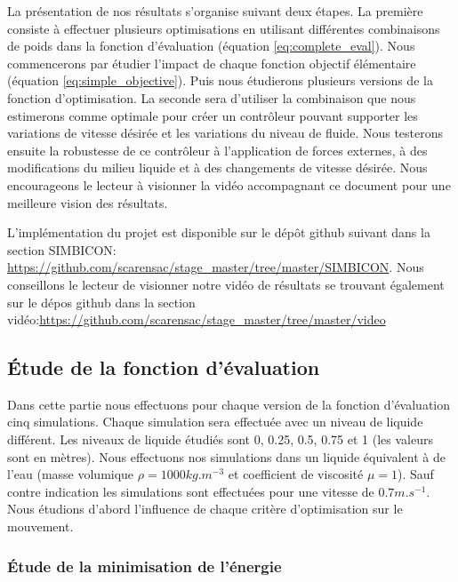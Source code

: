 \documentclass[runningheads,a4paper]{llncs}
\begin{document}
La présentation de nos résultats s'organise suivant deux étapes. La première consiste à effectuer plusieurs optimisations en utilisant différentes combinaisons de poids dans la fonction d'évaluation (équation \ref{eq:complete_eval}). Nous commencerons par étudier l'impact de chaque fonction objectif élémentaire (équation \ref{eq:simple_objective}). Puis nous étudierons plusieurs versions de la fonction d'optimisation. La seconde sera d'utiliser la combinaison que nous estimerons comme optimale pour créer un contrôleur pouvant supporter les variations de vitesse désirée et les variations du niveau de fluide. Nous testerons ensuite la robustesse de ce contrôleur à l'application de forces externes, à des modifications du milieu liquide et à des changements de vitesse désirée. Nous encourageons le lecteur à visionner la vidéo accompagnant ce document pour une meilleure vision des résultats.

L'implémentation du projet est disponible sur le dépôt github suivant dans la section SIMBICON: \url{https://github.com/scarensac/stage_master/tree/master/SIMBICON}. Nous conseillons le lecteur de visionner notre vidéo de résultats se trouvant également sur le dépos github dans la section vidéo:\url{https://github.com/scarensac/stage_master/tree/master/video}

\subsection{Étude de la fonction d'évaluation}

Dans cette partie nous effectuons pour chaque version de la fonction d'évaluation cinq simulations. Chaque simulation sera effectuée avec un niveau de liquide différent. Les niveaux de liquide étudiés sont 0, 0.25, 0.5, 0.75 et 1 (les valeurs sont en mètres). Nous effectuons nos simulations dans un liquide équivalent à de l'eau (masse volumique $\rho =1000kg.m^{-3}$ et coefficient de viscosité  $\mu =1$). Sauf contre indication les simulations sont effectuées pour une vitesse de $0.7m.s^{-1}$. Nous étudions d'abord l'influence de chaque critère d'optimisation sur le mouvement.

\subsubsection{Étude de la minimisation de l'énergie}
\end{document}
